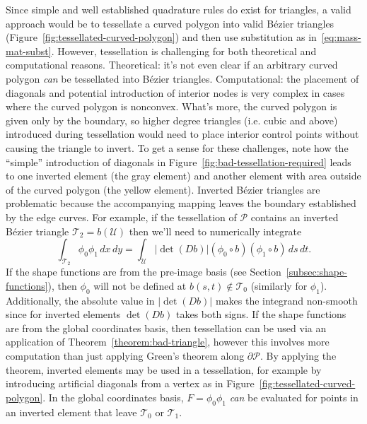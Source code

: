 \documentclass[letterpaper,10pt]{article}
\theoremstyle{definition}
\newcommand{\utri}{\mathcal{U}}
\begin{document}
Since simple and well established quadrature rules do exist for triangles,
a valid approach would be
to tessellate a curved polygon into valid B\'{e}zier triangles
(Figure~\ref{fig:tessellated-curved-polygon}) and then use substitution as
in~\eqref{eq:mass-mat-subst}. However, tessellation is challenging for both
theoretical and computational reasons.
Theoretical: it's not even clear if an arbitrary curved polygon \emph{can}
be tessellated into B\'{e}zier triangles. Computational: the placement
of diagonals and potential introduction of interior nodes is very
complex in cases where the curved polygon is nonconvex. What's more,
the curved polygon is given only by the boundary, so higher degree triangles
(i.e. cubic and above) introduced during tessellation would need to place
interior control points without causing the triangle to invert. To get a
sense for these challenges, note how the ``simple'' introduction of
diagonals in Figure~\ref{fig:bad-tessellation-required} leads to one
inverted element (the gray element) and another element with area outside
of the curved polygon (the yellow element). Inverted B\'{e}zier triangles
are problematic because the accompanying mapping leaves the boundary
established by the edge curves. For example,
if the tessellation of \(\mathcal{P}\) contains an inverted
B\'{e}zier triangle \(\mathcal{T}_2 = b\left(\utri\right)\) then we'll
need to numerically integrate
\begin{equation}
\int_{\mathcal{T}_2} \phi_0 \phi_1 \, dx \, dy =
  \int_{\utri} \left|\det(Db)\right| \left(\phi_0 \circ b\right)
  \left(\phi_1 \circ b\right) \, ds \, dt.
\end{equation}
If the shape functions are from the pre-image basis (see
Section~\ref{subsec:shape-functions}), then \(\phi_0\)
will not be defined at \(b(s, t) \not\in \mathcal{T}_0\) (similarly for
\(\phi_1\)). Additionally, the absolute value in \(\left|\det(Db)\right|\)
makes the integrand non-smooth since for inverted elements
\(\det(Db)\) takes both signs. If the shape functions are from the
global coordinates basis, then tessellation can be used via an
application of Theorem~\ref{theorem:bad-triangle}, however this involves
more computation than just applying Green's theorem along
\(\partial \mathcal{P}\). By applying the theorem, inverted elements may
be used in a tessellation, for example by introducing artificial
diagonals from a vertex as in Figure~\ref{fig:tessellated-curved-polygon}.
In the global coordinates basis, \(F = \phi_0 \phi_1\) \emph{can}
be evaluated for points in an inverted element that leave
\(\mathcal{T}_0\) or \(\mathcal{T}_1\).
\end{document}
